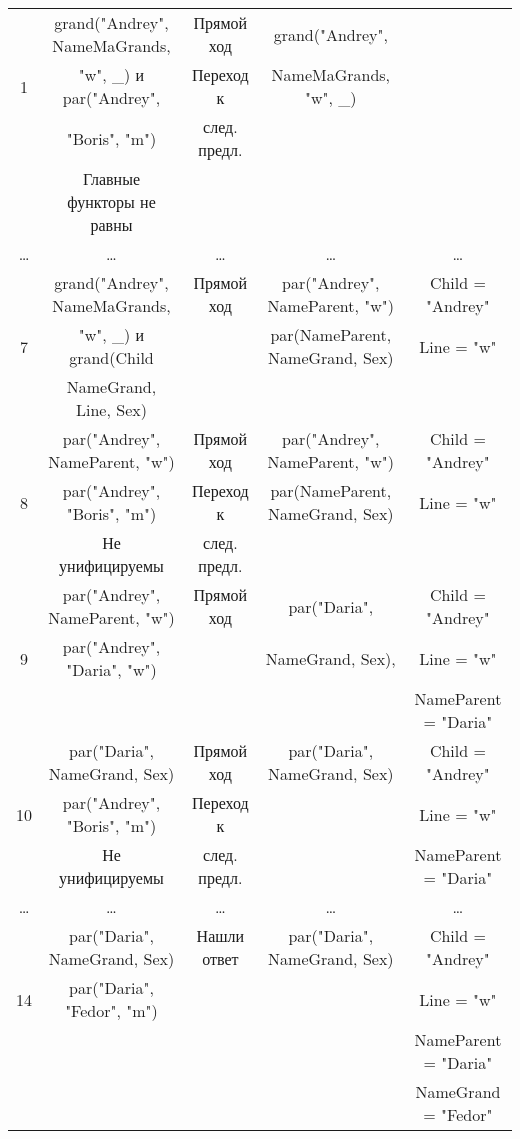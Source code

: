 \begin{landscape}
\begin{longtable}{|c|c|c|c|c|}
        \hline
              & grand("Andrey"{}, NameMaGrands, & Прямой ход & grand("Andrey"{}, & \\
            1 &  "w"{}, \_) и par("Andrey"{}, & Переход к & NameMaGrands, "w"{}, \_) &\\
              & "Boris"{}, "m"{}) & след. предл. & &\\
			  & Главные функторы не равны & & & \\
			\hline
			\dots & \dots & \dots & \dots & \dots \\
			\hline 
			  & grand("Andrey"{}, NameMaGrands, & Прямой ход & par("Andrey"{}, NameParent, "w"{}) & Child = "Andrey"{}\\
            7 &  "w"{}, \_) и grand(Child & & par(NameParent, NameGrand, Sex) & Line = "w"{} \\
              & NameGrand, Line, Sex) & &  &\\
			\hline
              & par("Andrey"{}, NameParent, "w"{}) & Прямой ход & par("Andrey"{}, NameParent, "w"{}) & Child = "Andrey"{}\\
            8 & par("Andrey"{}, "Boris"{}, "m"{}) & Переход к & par(NameParent, NameGrand, Sex) & Line = "w"{} \\
			  & Не унифицируемы & след. предл. & & \\
			\hline
              & par("Andrey"{}, NameParent, "w"{}) & Прямой ход & par("Daria"{}, & Child = "Andrey"{}\\
            9 & par("Andrey"{}, "Daria"{}, "w"{}) & & NameGrand, Sex), & Line = "w"{} \\
              &  & & & NameParent = "Daria"{}\\
            \hline
              & par("Daria"{}, NameGrand, Sex) & Прямой ход & par("Daria"{}, NameGrand, Sex) & Child = "Andrey"{}\\
            10 & par("Andrey"{}, "Boris"{}, "m"{}) & Переход к & & Line = "w"{} \\
              & Не унифицируемы & след. предл. & & NameParent = "Daria"{}\\
			\hline
			\dots & \dots & \dots & \dots & \dots \\
            \hline
              & par("Daria"{}, NameGrand, Sex) & Нашли ответ & par("Daria"{}, NameGrand, Sex) & Child = "Andrey"{}\\
            14 & par("Daria"{}, "Fedor"{}, "m"{}) & & & Line = "w"{} \\
              & & & & NameParent = "Daria"{}\\
              & & & & NameGrand = "Fedor"{}\\

\end{longtable}
\end{landscape}
